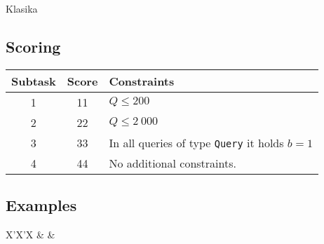 \begin{statement}[
  problempoints=110,
  timelimit=5 seconds,
  memorylimit=512 MiB,
]{Klasika}
 \subsection*{Scoring}
{\renewcommand{\arraystretch}{1.4}
  \setlength{\tabcolsep}{6pt}
  \begin{tabular}{ccl}
 Subtask & Score & Constraints \\ \midrule
  1 & 11 & $Q \le 200$ \\
  2 & 22 & $Q \le 2\ 000$ \\
  3 & 33 & In all queries of type \texttt{Query} it holds $b=1$ \\
  4 & 44 & No additional constraints.
\end{tabular}}

\subsection*{Examples}
\begin{tabularx}{\textwidth}{X'X'X}
 &
 &
\end{tabularx}

\end{statement}

